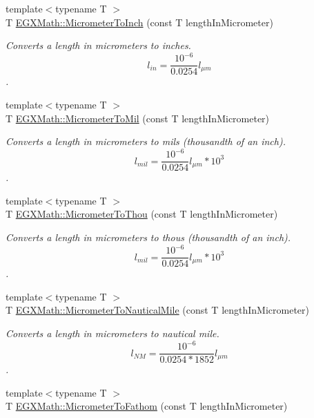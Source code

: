 \begin{DoxyCompactItemize}
{\footnotesize template$<$typename T $>$ }\\T \mbox{\hyperlink{group___e_g_x_math-_conversions-_length_conversions-_s_i-_micrometer-_imperial_gad372acac36a8ca7f56b26858dd01546b}{E\+G\+X\+Math\+::\+Micrometer\+To\+Inch}} (const T length\+In\+Micrometer)
\begin{DoxyCompactList}\small\item\em Converts a length in micrometers to inches. \[ l_{in}= \frac{10^{-6}}{0.0254} l_{\mu m} \]. \end{DoxyCompactList}\item 
{\footnotesize template$<$typename T $>$ }\\T \mbox{\hyperlink{group___e_g_x_math-_conversions-_length_conversions-_s_i-_micrometer-_imperial_ga94d0f5a6ba598898a13e3a8837d7c681}{E\+G\+X\+Math\+::\+Micrometer\+To\+Mil}} (const T length\+In\+Micrometer)
\begin{DoxyCompactList}\small\item\em Converts a length in micrometers to mils (thousandth of an inch). \[ l_{mil}= \frac{10^{-6}}{0.0254} l_{\mu m} * 10^{3} \]. \end{DoxyCompactList}\item 
{\footnotesize template$<$typename T $>$ }\\T \mbox{\hyperlink{group___e_g_x_math-_conversions-_length_conversions-_s_i-_micrometer-_imperial_ga8a2cfa132c629695ff469f66e1ab5919}{E\+G\+X\+Math\+::\+Micrometer\+To\+Thou}} (const T length\+In\+Micrometer)
\begin{DoxyCompactList}\small\item\em Converts a length in micrometers to thous (thousandth of an inch). \[ l_{mil}= \frac{10^{-6}}{0.0254} l_{\mu m} * 10^{3} \]. \end{DoxyCompactList}\item 
{\footnotesize template$<$typename T $>$ }\\T \mbox{\hyperlink{group___e_g_x_math-_conversions-_length_conversions-_s_i-_micrometer-_nautical_ga43c5eb76a19baf316e06b38781369157}{E\+G\+X\+Math\+::\+Micrometer\+To\+Nautical\+Mile}} (const T length\+In\+Micrometer)
\begin{DoxyCompactList}\small\item\em Converts a length in micrometers to nautical mile. \[ l_{NM}= \frac{10^{-6}}{0.0254 * 1852} l_{\mu m} \]. \end{DoxyCompactList}\item 
{\footnotesize template$<$typename T $>$ }\\T \mbox{\hyperlink{group___e_g_x_math-_conversions-_length_conversions-_s_i-_micrometer-_nautical_gad7205d8bf0d8735b12fc0b03c67cf0f7}{E\+G\+X\+Math\+::\+Micrometer\+To\+Fathom}} (const T length\+In\+Micrometer)

\end{DoxyCompactItemize}
